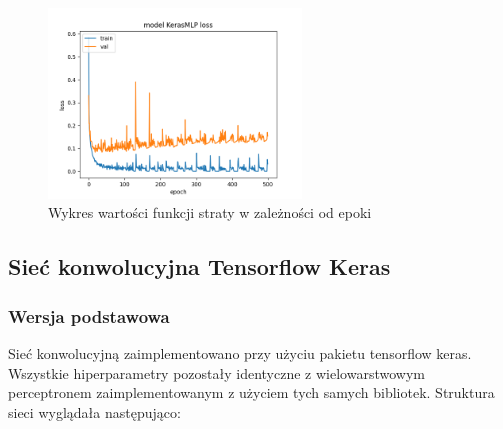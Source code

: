 \documentclass{article}
\begin{document}
\begin{figure}[H]
    \centering
    \includegraphics[width=0.6\textwidth]{../Saves/KerasMLP/mnist-784/KerasMLP_mnist_784_ep500_loss.png}
    \caption{Wykres wartości funkcji straty w zależności od epoki}
\end{figure}

\subsection{Sieć konwolucyjna Tensorflow Keras}

\subsubsection{Wersja podstawowa}
Sieć konwolucyjną zaimplementowano przy użyciu pakietu tensorflow keras. Wszystkie hiperparametry pozostały 
identyczne z wielowarstwowym perceptronem zaimplementowanym z użyciem tych samych bibliotek. 
Struktura sieci wyglądała następująco:

\end{document}
